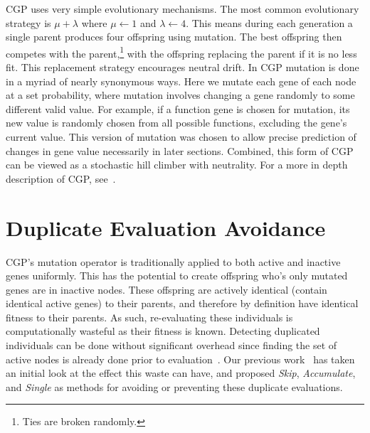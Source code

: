 \documentclass[journal]{IEEEtran}
\begin{document}
CGP uses very simple evolutionary mechanisms.  The most common evolutionary strategy
is $\mu + \lambda$ where $\mu \leftarrow 1$ and $\lambda \leftarrow 4$.
This means during each generation a single parent produces four offspring using
mutation.  The best offspring then competes with the parent,\footnote{Ties are broken
randomly.} with the offspring
replacing the parent if it is no less fit.  This replacement strategy encourages
neutral drift.
In CGP mutation is done in a myriad of nearly synonymous ways.  Here we mutate
each gene of each node at a set probability, where mutation
involves changing a gene randomly to some different valid value.  For example,
if a function gene is chosen for mutation, its new value is randomly chosen from
all possible functions, excluding the gene's current value.
This version of mutation was chosen to allow precise prediction of changes
in gene value necessarily in later sections.
Combined,
this form of CGP can be viewed as a stochastic hill climber with neutrality.
For a more in depth description of CGP, see~\cite{miller:2011:chapter2}.

\section{Duplicate Evaluation Avoidance}
\label{sec:duplicate}
CGP's mutation operator is traditionally applied to both active and inactive genes uniformly.
This has the
potential to create offspring who's only mutated genes are in inactive nodes.
These offspring are actively identical (contain identical active genes) to their
parents, and therefore by definition have identical fitness to their parents.
As such, re-evaluating these individuals is computationally wasteful as their fitness
is known.
Detecting duplicated individuals can be done without significant overhead since
finding the set of active nodes is already done prior to
evaluation~\cite{vasicek:2012:efficient}.
Our previous work~\cite{goldman:2013:cgpwaste} has taken an initial look at the
effect this waste can have, and proposed \emph{Skip}, \emph{Accumulate}, and
\emph{Single} as methods for avoiding or preventing these duplicate evaluations.

\end{document}
